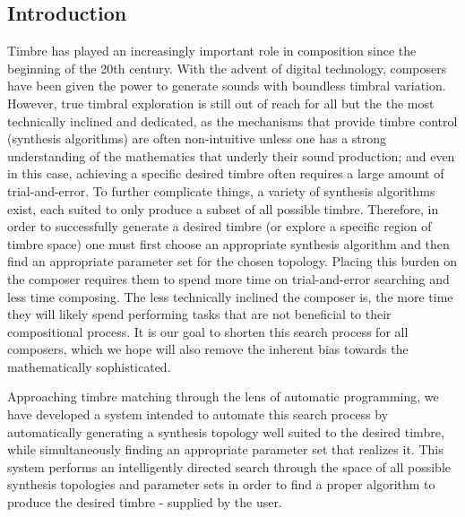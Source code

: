 \documentclass[a4paper,12pt]{report} 	%
\numberwithin{figure}{chapter}
\numberwithin{table}{chapter}
\numberwithin{equation}{chapter}
\begin{document}
\begin{flushleft}				%
\setlength{\parindent}{30pt}	%

				
\vspace*{\QuarterPage}
\newpage
{}
\chapter{Introduction} %
Timbre has played an increasingly important role in composition since the beginning of the 20th century. With the advent of digital technology, composers have been given the power to generate sounds with boundless timbral variation. However, true timbral exploration is still out of reach for all but the the most technically inclined and dedicated, as the mechanisms that provide timbre control (synthesis algorithms) are often non-intuitive unless one has a strong understanding of the mathematics that underly their sound production; and even in this case, achieving a specific desired timbre often requires a large amount of trial-and-error. To further complicate things, a variety of synthesis algorithms exist, each suited to only produce a subset of all possible timbre. Therefore, in order to successfully generate a desired timbre (or explore a specific region of timbre space) one must first choose an appropriate synthesis algorithm and then find an appropriate parameter set for the chosen topology. Placing this burden on the composer requires them to spend more time on trial-and-error searching and less time composing. The less technically inclined the composer is, the more time they will likely spend performing tasks that are not beneficial to their compositional process. It is our goal to shorten this search process for all composers, which we hope will also remove the inherent bias towards the mathematically sophisticated.
	
Approaching timbre matching through the lens of automatic programming, we have developed a system intended to automate this search process by automatically generating a synthesis topology well suited to the desired timbre, while simultaneously finding an appropriate parameter set that realizes it. This system performs an intelligently directed search through the space of all possible synthesis topologies and parameter sets in order to find a proper algorithm to produce the desired timbre - supplied by the user.


\end{flushleft}
\end{document}
